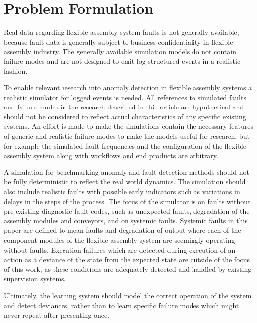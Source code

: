 \documentclass[procedia]{easychair}
\begin{document}
\section{Problem Formulation}

Real data regarding flexible assembly system faults is
not generally available, because fault data is generally subject to business confidentiality in flexible assembly industry.
The generally available simulation models do not contain failure modes and are not designed to emit
log structured events in a realistic fashion.

To enable relevant research into anomaly detection in flexible assembly systems a realistic simulator for logged events is needed.
All references to simulated faults and failure modes in the research described in this article are hypothetical and should not be considered to
reflect actual characteristics of any specific existing systems. An effort is made to make the simulations contain the necessary features of
generic and realistic failure modes to make the models useful for research, but for example the simulated fault frequencies and the configuration
of the flexible assembly system along with workflows and end products are arbitrary.

A simulation for benchmarking anomaly and fault detection methods should not be fully deterministic to reflect the real world dynamics. The simulation should also
include realistic faults with possible early indicators such as variations in delays in the steps of the process. The focus of the simulator is on faults without pre-existing
diagnostic fault codes, such as unexpected faults, degradation of the assembly modules and conveyors, and on systemic faults. Systemic faults in this paper
are defined to mean faults and degradation of output where each of the component modules of the flexible assembly system are seemingly operating without faults. Execution failures
which are detected during execution of an action as a deviance of the state from the expected state are outside of the focus of this work, as these conditions are adequately detected and handled
by existing supervision systems.

Ultimately, the learning system should model the correct operation of the system and detect deviances, rather than to learn specific failure modes which might never repeat after presenting once.
\end{document}
